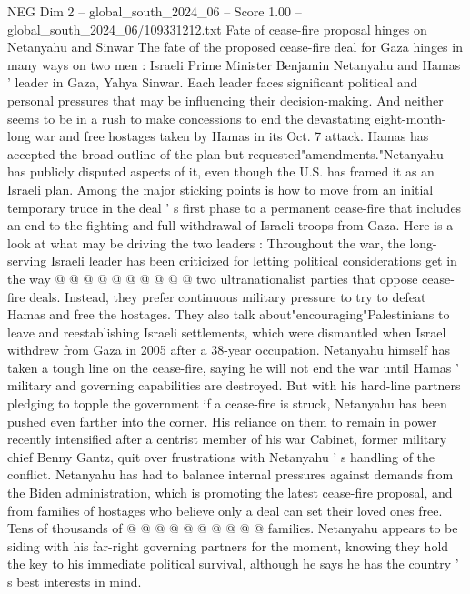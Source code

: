 \begin{textsample}{NEG Dim 2 – global\_south\_2024\_06 – Score 1.00 – global\_south\_2024\_06/109331212.txt}  \label{ex:f2_neg_392}
Fate of cease-fire proposal hinges on Netanyahu and Sinwar The fate of the proposed cease-fire deal for Gaza hinges in many ways on two men : Israeli Prime Minister Benjamin Netanyahu and Hamas ' leader in Gaza, Yahya Sinwar.
Each leader faces significant political and personal pressures that may be influencing their decision-making.
And neither seems to be in a rush to make concessions to end the devastating eight-month-long war and free hostages taken by Hamas in its Oct. 7 attack.
Hamas has accepted the broad outline of the plan but requested"amendments."Netanyahu has publicly disputed aspects of it, even though the U.S. has framed it as an Israeli plan.
Among the major sticking points is how to move from an initial temporary truce in the deal ' s first phase to a permanent cease-fire that includes an end to the fighting and full withdrawal of Israeli troops from Gaza.
Here is a look at what may be driving the two leaders : Throughout the war, the long-serving Israeli leader has been criticized for letting political considerations get in the way @ @ @ @ @ @ @ @ @ @ two ultranationalist parties that oppose cease-fire deals.
Instead, they prefer continuous military pressure to try to defeat Hamas and free the hostages.
They also talk about"encouraging"Palestinians to leave and reestablishing Israeli settlements, which were dismantled when Israel withdrew from Gaza in 2005 after a 38-year occupation.
Netanyahu himself has taken a tough line on the cease-fire, saying he will not end the war until Hamas ' military and governing capabilities are destroyed.
But with his hard-line partners pledging to topple the government if a cease-fire is struck, Netanyahu has been pushed even farther into the corner.
His reliance on them to remain in power recently intensified after a centrist member of his war Cabinet, former military chief Benny Gantz, quit over frustrations with Netanyahu ' s handling of the conflict.
Netanyahu has had to balance internal pressures against demands from the Biden administration, which is promoting the latest cease-fire proposal, and from families of hostages who believe only a deal can set their loved ones free.
Tens of thousands of @ @ @ @ @ @ @ @ @ @ families.
Netanyahu appears to be siding with his far-right governing partners for the moment, knowing they hold the key to his immediate political survival, although he says he has the country ' s best interests in mind.

\end{textsample}
